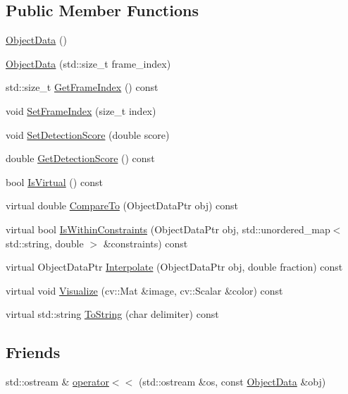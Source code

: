 \subsection*{Public Member Functions}
\begin{DoxyCompactItemize}
\item 
\hyperlink{classcore_1_1ObjectData_a7f47a396a3b9e8c12a1557c8156b8ff9}{Object\+Data} ()
\item 
\hyperlink{classcore_1_1ObjectData_af4333a52b012841a6ba73b25aeaae71b}{Object\+Data} (std\+::size\+\_\+t frame\+\_\+index)
\item 
std\+::size\+\_\+t \hyperlink{classcore_1_1ObjectData_a1151e9215baf315f4b98f696f4271162}{Get\+Frame\+Index} () const
\item 
void \hyperlink{classcore_1_1ObjectData_aedfe00fa37d5ac7ef554bda746931148}{Set\+Frame\+Index} (size\+\_\+t index)
\item 
void \hyperlink{classcore_1_1ObjectData_a737216c2689aefa216c1c842922d7dd8}{Set\+Detection\+Score} (double score)
\item 
double \hyperlink{classcore_1_1ObjectData_a227a11377867105d5fcbe9efc3faed45}{Get\+Detection\+Score} () const
\item 
bool \hyperlink{classcore_1_1ObjectData_a2880d710cfa520e9c0453e2a6729c0e2}{Is\+Virtual} () const
\item 
virtual double \hyperlink{classcore_1_1ObjectData_afbf7a1e87235f1b204d4d2eb8a37a9a6}{Compare\+To} (Object\+Data\+Ptr obj) const
\item 
virtual bool \hyperlink{classcore_1_1ObjectData_affa5d25fa3d2c04a571a7e095f62bacb}{Is\+Within\+Constraints} (Object\+Data\+Ptr obj, std\+::unordered\+\_\+map$<$ std\+::string, double $>$ \&constraints) const
\item 
virtual Object\+Data\+Ptr \hyperlink{classcore_1_1ObjectData_ad681915317decab76c384a635fc8444e}{Interpolate} (Object\+Data\+Ptr obj, double fraction) const
\item 
virtual void \hyperlink{classcore_1_1ObjectData_aae2c4fceddc529570dbe8909309f9961}{Visualize} (cv\+::\+Mat \&image, cv\+::\+Scalar \&color) const
\item 
virtual std\+::string \hyperlink{classcore_1_1ObjectData_a1d864ed88355e636c5783c18c9ab0555}{To\+String} (char delimiter) const
\end{DoxyCompactItemize}
\subsection*{Friends}
\begin{DoxyCompactItemize}
\item 
std\+::ostream \& \hyperlink{classcore_1_1ObjectData_a56fc9b6184428bf4d80826bbb9fe4c6f}{operator$<$$<$} (std\+::ostream \&os, const \hyperlink{classcore_1_1ObjectData}{Object\+Data} \&obj)
\end{DoxyCompactItemize}



